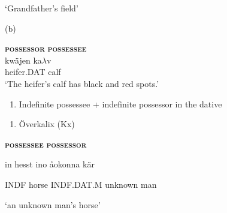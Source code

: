‘Grandfather’s field’
\z


(b)


\ea\label{}
\gll \textbf{\textsc{possessor}} \textbf{\textsc{possessee}}\\


\ea\label{}
\gll kwäjen  ka$\lambda $v\\


heifer.DAT  calf\\ %


‘The heifer’s calf has black and red spots.’
\z


\begin{enumerate} %
\item 
Indefinite possessee + indefinite possessor in the dative

\end{enumerate} %
\begin{enumerate} %
\item 
Överkalix (Kx)

\end{enumerate} %
\textbf{\textsc{possessee}} \textbf{\textsc{possessor}}


in  hesst  ino  åokonna  kär


INDF  horse  INDF.DAT.M  unknown  man


 ‘an unknown man’s horse’
\z


